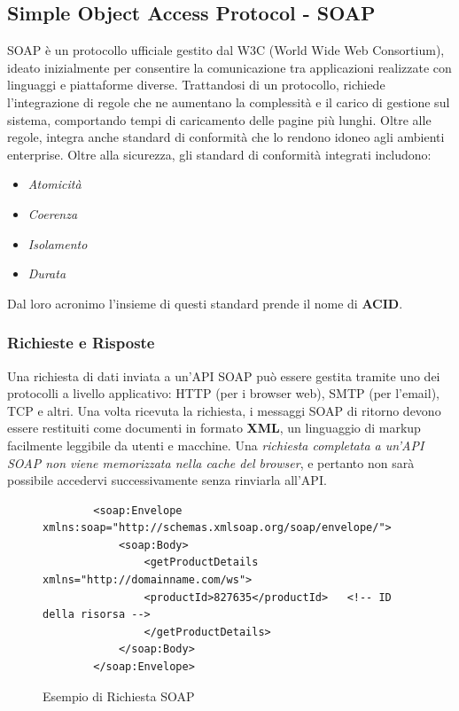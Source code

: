 \subsection{Simple Object Access Protocol - SOAP}
SOAP è un protocollo ufficiale gestito dal W3C (World Wide Web Consortium), ideato inizialmente per consentire la comunicazione tra applicazioni realizzate con linguaggi e piattaforme diverse. Trattandosi di un protocollo, richiede l'integrazione di regole che ne aumentano la complessità e il carico di gestione sul sistema, comportando tempi di caricamento delle pagine più lunghi. Oltre alle regole, integra anche standard di conformità che lo rendono idoneo agli ambienti enterprise. Oltre alla sicurezza, gli standard di conformità integrati includono: 
\begin{itemize}
    \item \emph{Atomicità}
    \item \emph{Coerenza}
    \item \emph{Isolamento}
    \item \emph{Durata}
\end{itemize}
Dal loro acronimo l'insieme di questi standard prende il nome di \textbf{ACID}.

\subsubsection{Richieste e Risposte}
Una richiesta di dati inviata a un'API SOAP può essere gestita tramite uno dei protocolli a livello applicativo: HTTP (per i browser web), SMTP (per l'email), TCP e altri. Una volta ricevuta la richiesta, i messaggi SOAP di ritorno devono essere restituiti come documenti in formato \textbf{XML}, un linguaggio di markup facilmente leggibile da utenti e macchine. Una \textit{richiesta completata a un'API SOAP non viene memorizzata nella cache del browser}, e pertanto non sarà possibile accedervi successivamente senza rinviarla all'API.

\begin{figure}[H]
    \begin{verbatim}
        <soap:Envelope xmlns:soap="http://schemas.xmlsoap.org/soap/envelope/">
            <soap:Body>
                <getProductDetails xmlns="http://domainname.com/ws">
                <productId>827635</productId>   <!-- ID della risorsa -->
                </getProductDetails>
            </soap:Body>
        </soap:Envelope>
    \end{verbatim}
    \caption{Esempio di Richiesta SOAP}
    \label{fig:soaprequest}
\end{figure}


